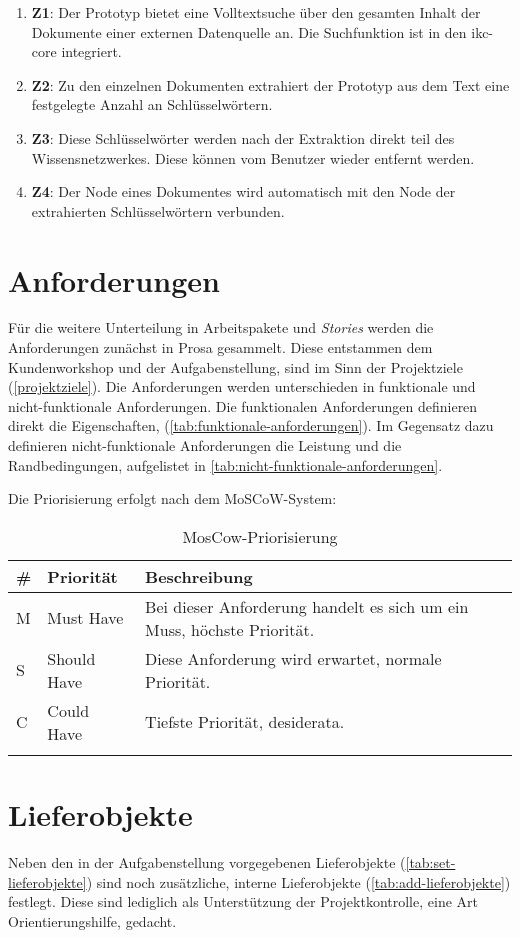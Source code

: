 \begin{enumerate}
    \item \textbf{Z1}: Der Prototyp bietet eine Volltextsuche über den gesamten Inhalt der Dokumente einer externen Datenquelle an. Die Suchfunktion ist in den \gls{ikc-core} integriert.
    \item \textbf{Z2}: Zu den einzelnen Dokumenten extrahiert der Prototyp aus dem Text eine festgelegte Anzahl an Schlüsselwörtern.
    \item \textbf{Z3}: Diese Schlüsselwörter werden nach der Extraktion direkt teil des Wissensnetzwerkes. Diese können vom Benutzer wieder entfernt werden.
    \item \textbf{Z4}: Der Node eines Dokumentes wird automatisch mit den Node der extrahierten Schlüsselwörtern verbunden. 
\end{enumerate}

\section{Anforderungen} \label{sec:anforderungen}

Für die weitere Unterteilung in Arbeitspakete und \textit{Stories} werden die Anforderungen zunächst in Prosa gesammelt. Diese entstammen dem Kundenworkshop und der Aufgabenstellung, sind im Sinn der Projektziele (\autoref{projektziele}). Die Anforderungen werden unterschieden in funktionale und nicht-funktionale Anforderungen. Die funktionalen Anforderungen definieren direkt die Eigenschaften, (\autoref{tab:funktionale-anforderungen}). Im Gegensatz dazu definieren nicht-funktionale Anforderungen die Leistung und die Randbedingungen, aufgelistet in \autoref{tab:nicht-funktionale-anforderungen}.

Die Priorisierung erfolgt nach dem \gls{MoSCoW-System}:

\begin{longtable}{|p{1.5cm} | p{2.5cm} | p{7.2cm}|}
  \hline
    \# & Priorität & Beschreibung \\\hline
    M & Must Have & Bei dieser Anforderung handelt es sich um ein Muss, höchste Priorität.\\\hline
    S & Should Have & Diese Anforderung wird erwartet, normale Priorität.\\\hline
    C & Could Have & Tiefste Priorität, desiderata.\\\hline
    \caption{MosCow-Priorisierung}
  \label{tab:moscow}
\end{longtable}


\section{Lieferobjekte}\label{lieferobjekte}

Neben den in der Aufgabenstellung vorgegebenen Lieferobjekte (\autoref{tab:set-lieferobjekte}) sind noch zusätzliche, interne Lieferobjekte (\autoref{tab:add-lieferobjekte}) festlegt. Diese sind lediglich als Unterstützung der Projektkontrolle, eine Art Orientierungshilfe, gedacht.

